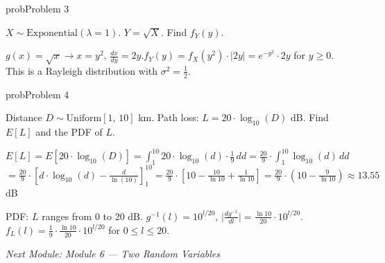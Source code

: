 \begin{PSbox}[unbreakable]{prob}{Problem 3}

$X \sim \mathrm{Exponential}(\lambda = 1)$. $Y = \sqrt{X}$. Find $f_{Y}(y)$.

\PSsolution{} $\displaystyle g(x) = \sqrt{x} \to x = y^{2},\, \frac{dx}{dy} = 2y$.\PSbr{}$f_{Y}(y) = f_{X}(y^{2}) \cdot \lvert 2y\rvert = e^{-y^{2}} \cdot 2y$ for $y \ge 0$. This is a Rayleigh distribution with $\sigma^{2} = \frac{1}{2}$.

\end{PSbox}

\begin{PSbox}[unbreakable]{prob}{Problem 4}

Distance $D \sim \mathrm{Uniform}[1,\, 10]$ km. Path loss: $L = 20 \cdot \log_{10}(D)$ dB. Find $E[L]$ and the PDF of $L$.

\PSsolution{} $\displaystyle E[L] = E[20 \cdot \log_{10}(D)] = \int_{1}^{10} 20 \cdot \log_{10}(d) \cdot \frac{1}{9}\,dd = \frac{20}{9} \cdot \int_{1}^{10} \log_{10}(d)\,dd$\PSbr{}$= \frac{20}{9} \cdot \left[d \cdot \log_{10}(d) - \frac{d}{\ln (10)}\right]_{1}^{10} = \frac{20}{9} \cdot \left[10 - \frac{10}{\ln 10} + \frac{1}{\ln 10}\right] = \frac{20}{9} \cdot \left(10 - \frac{9}{\ln 10}\right) \approx 13.55$ dB

PDF: $L$ ranges from 0 to 20 dB. $g^{-1}(l) = 10^{l/20},\, \lvert \frac{dg^{-1}}{dl}\rvert = \frac{\ln 10}{20} \cdot 10^{l/20}$.\PSbr{}$f_{L}(l) = \frac{1}{9} \cdot \frac{\ln 10}{20} \cdot 10^{l/20}$ for $0 \le l \le 20$.

\end{PSbox}

\emph{Next Module: {Module 6 — Two Random Variables}}
